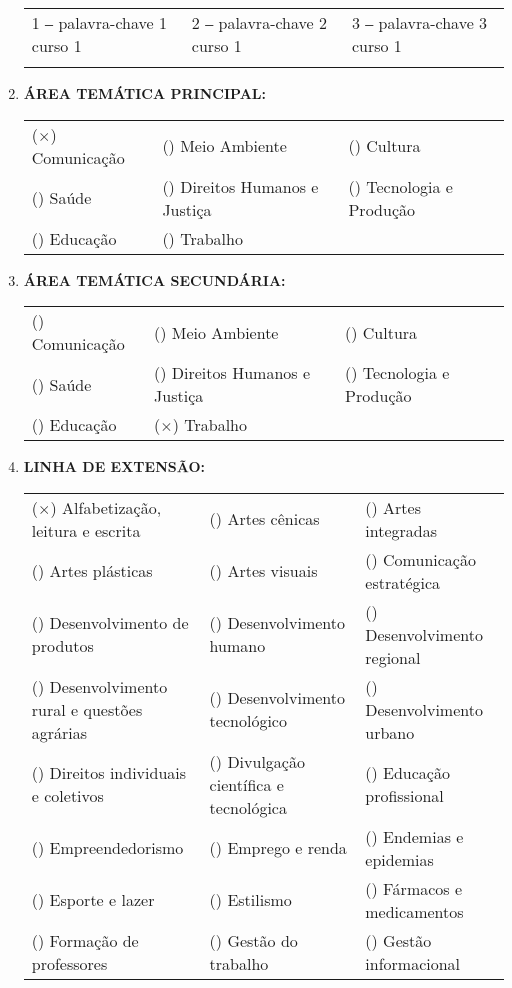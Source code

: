 \documentclass[12pt,a4paper,oneside]{article}%
\begin{document}
\begin{enumerate}
\begin{tabularx}{\linewidth}{|X|X|X|}
\hline%
1 ‒ palavra{-}chave 1 curso 1&2 ‒ palavra{-}chave 2 curso 1&3 ‒ palavra{-}chave 3 curso 1\\%
&&\\%
\hline%
\end{tabularx}%
\item%
\textbf{ÁREA TEMÁTICA PRINCIPAL: }%
\newline%
\begin{tabularx}{\linewidth}{|X|X|X|}%
\hline%
($\times$) Comunicação&() Meio Ambiente&() Cultura\\%
() Saúde&() Direitos Humanos e Justiça&() Tecnologia e Produção\\%
() Educação&() Trabalho&\\%
\hline%
\end{tabularx}%
\item%
\textbf{ÁREA TEMÁTICA SECUNDÁRIA: }%
\newline%
\begin{tabularx}{\linewidth}{|X|X|X|}%
\hline%
() Comunicação&() Meio Ambiente&() Cultura\\%
() Saúde&() Direitos Humanos e Justiça&() Tecnologia e Produção\\%
() Educação&($\times$) Trabalho&\\%
\hline%
\end{tabularx}%
\newpage%
\item%
\textbf{LINHA DE EXTENSÃO: }%
\newline%
\newline%
{\tiny%
\begin{tabularx}{\linewidth}{X|X|X}%
($\times$) Alfabetização, leitura e escrita&() Artes cênicas&() Artes integradas\\%
() Artes plásticas&() Artes visuais&() Comunicação estratégica\\%
() Desenvolvimento de produtos&() Desenvolvimento humano&() Desenvolvimento regional\\%
() Desenvolvimento rural e questões agrárias&() Desenvolvimento tecnológico&() Desenvolvimento urbano\\%
() Direitos individuais e coletivos&() Divulgação científica e tecnológica&() Educação profissional\\%
() Empreendedorismo&() Emprego e renda&() Endemias e epidemias\\%
() Esporte e lazer&() Estilismo&() Fármacos e medicamentos\\%
() Formação de professores&() Gestão do trabalho&() Gestão informacional\\%

\end{tabularx}}
\end{enumerate}
\end{document}
